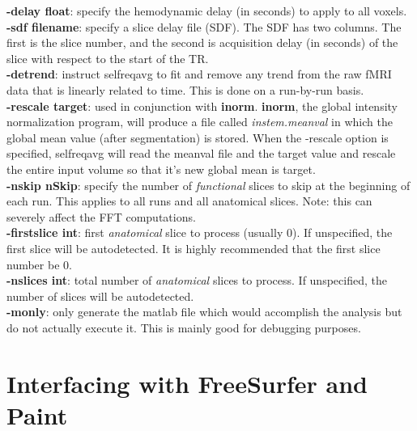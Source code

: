 \documentclass[10pt]{article}
\begin{document}
\noindent
{\bf -delay float}: specify the hemodynamic delay (in seconds) to
apply to all voxels.\\

\noindent
{\bf -sdf filename}: specify a slice delay file (SDF).  The SDF has
two columns.  The first is the slice number, and the second is
acquisition delay (in seconds) of the slice with respect to the start
of the TR.\\

\noindent
{\bf -detrend}: instruct selfreqavg to fit and remove any trend
from the raw fMRI data that is linearly related to time.
This is done on a run-by-run basis.\\

\noindent
{\bf -rescale target}: used in conjunction with {\bf inorm}.  {\bf inorm},
the global intensity normalization program, will produce a file called
{\em instem.meanval} in which the global mean value (after
segmentation) is stored.  When the -rescale option is specified,
selfreqavg will read the meanval file and the target value and rescale
the entire input volume so that it's new global mean is target.\\

\noindent
{\bf -nskip nSkip}: specify the number of {\em functional} slices to
skip at the beginning of each run.  This applies to all runs and
all anatomical slices.  Note: this can severely affect the FFT
computations. \\

\noindent
{\bf -firstslice int}: first {\em anatomical} slice to process (usually 0).
If unspecified, the first slice will be autodetected.  It is
highly recommended that the first slice number be 0.\\

\noindent
{\bf -nslices int}: total number of {\em anatomical} slices to
process.  If unspecified, the number of slices will be autodetected.\\

\noindent
{\bf -monly}: only generate the matlab file which would accomplish the
analysis but do not actually execute it.  This is mainly good for
debugging purposes.\\

\section{Interfacing with FreeSurfer and Paint}
\end{document}

